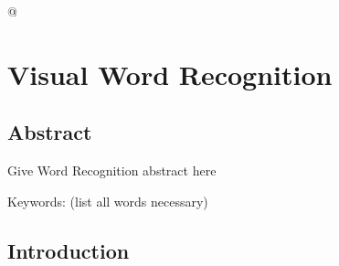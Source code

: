\documentclass[
12pt, %
english, %
doublespacing, %
nolistspacing, %
liststotoc, %
headsepline, %
chapterinoneline, %
openany, %
]{DoctoralThesis}\usepackage[]{graphicx}\usepackage[]{color}
\begin{document}










@


\chapter{Visual Word Recognition} %

\label{Chapter4} %

\section{Abstract}

Give Word Recognition abstract here

Keywords: (list all words necessary)


\section{Introduction}
\end{document}

